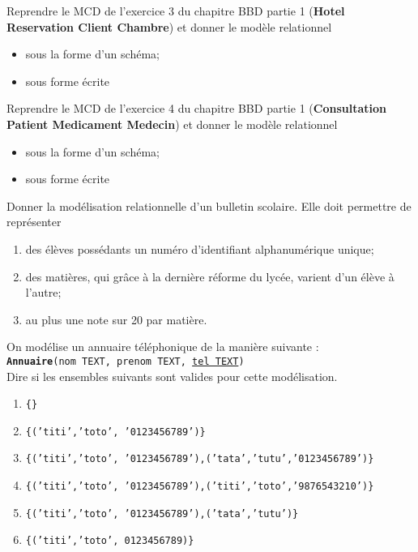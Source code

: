 \documentclass[a4paper,12pt,french]{article}
\begin{document}


\begin{exercice}[]
Reprendre le MCD de l'exercice 3 du chapitre \og BBD partie 1\fg{} (\textbf{Hotel Reservation Client Chambre}) et donner le modèle relationnel
\begin{itemize}
	\item	sous la forme d'un schéma;
	\item	sous forme écrite
\end{itemize}
\end{exercice}

\begin{exercice}[]
Reprendre le MCD de l'exercice 4 du chapitre \og BBD partie 1\fg{} (\textbf{Consultation Patient Medicament Medecin}) et donner le modèle relationnel
\begin{itemize}
	\item	sous la forme d'un schéma;
	\item	sous forme écrite
\end{itemize}
\end{exercice}

\begin{exercice}[]
Donner la modélisation relationnelle d'un bulletin scolaire. Elle doit permettre de représenter
\begin{enumerate}[--]
	\item 	des élèves possédants un numéro d'identifiant alphanumérique unique;
	\item 	des matières, qui grâce à la dernière réforme du lycée, varient d'un élève à l'autre;
    \item 	au plus une note sur 20 par matière.
\end{enumerate}
\end{exercice}

\begin{exercice}[]
On modélise un annuaire téléphonique de la manière suivante :\\

\texttt{\textbf{Annuaire}(nom TEXT, prenom TEXT, \uline{tel TEXT})}\\

Dire si les ensembles suivants sont valides pour cette modélisation.
\begin{enumerate}[\bfseries 1.]
	\item 	\texttt{\{\}}
	\item 	\texttt{\{('titi','toto', '0123456789')\}}
    \item 	\texttt{\{('titi','toto', '0123456789'),('tata','tutu','0123456789')\}}
    \item 	\texttt{\{('titi','toto', '0123456789'),('titi','toto','9876543210')\}}
    \item 	\texttt{\{('titi','toto', '0123456789'),('tata','tutu')\}}
    \item 	\texttt{\{('titi','toto', 0123456789)\}}
\end{enumerate}
\end{exercice}
\end{document}
